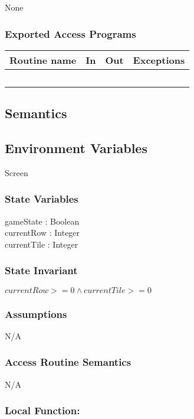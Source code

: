 \documentclass[12pt]{article}
\begin{document}
None

\subsubsection* {Exported Access Programs}

\begin{tabular}{| l | l | l | p{6cm} |}
\hline
\textbf{Routine name} & \textbf{In} & \textbf{Out} & \textbf{Exceptions}\\
\hline
~ & ~ & ~ &  \\
\hline
\end{tabular}

\subsection* {Semantics}

\subsection*{Environment Variables}

Screen

\subsubsection* {State Variables}

gameState : Boolean \\
currentRow : Integer \\
currentTile : Integer

\subsubsection* {State Invariant}

$currentRow >= 0 \wedge currentTile >= 0$

\subsubsection* {Assumptions}

N/A

\subsubsection* {Access Routine Semantics}

N/A

\subsubsection*{Local Function:}
\end{document}
